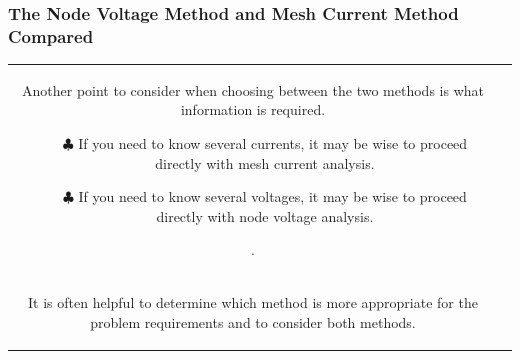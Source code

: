\documentclass[aspectratio=169]{beamer}
\begin{document}
\begin{frame}[fragile]
	\frametitle{ The Node Voltage Method and Mesh Current Method Compared}
	\begin{tabular}{cc}
			\begin{columns}
				\begin{column}{1\textwidth}  %
					Another point to consider when choosing between the two methods is what information is
required.	\newline
		
					\begin{itemize}
						\item[$\clubsuit$] {If you need to know several currents, it may be wise to proceed directly with mesh current analysis.}
						\item[$\clubsuit$] {If you need to know several voltages, it may be wise to proceed directly with node voltage  analysis.}						
					\end{itemize}
				.
				\end{column}


			\end{columns}\\
			\begin{columns}
			\begin{column}{1\textwidth} 
			It is often helpful to determine which method is more appropriate for the problem requirements
			and to consider both methods.
			\end{column}
			\end{columns}
	\end{tabular}
\end{frame}
\end{document}
